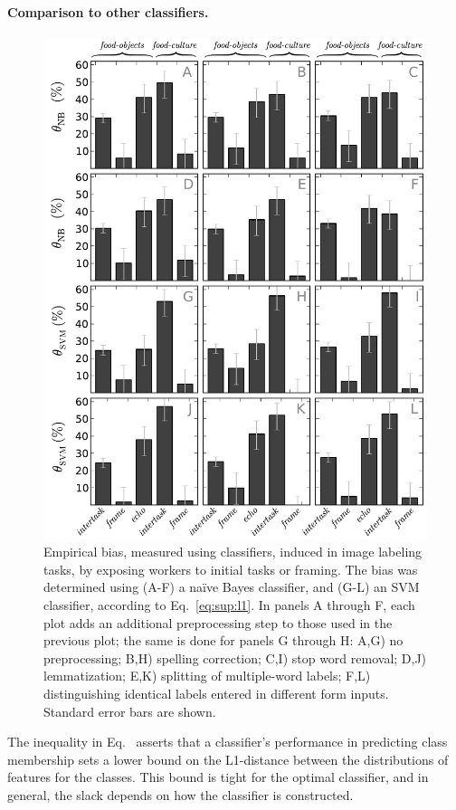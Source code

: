 \documentclass{sigchi}
\begin{document}
\paragraph{Comparison to other classifiers.} 

\begin{figure}
	\centering
	\includegraphics[scale=0.75]{figs/theta_sup.pdf}
	\caption{
		Empirical bias, measured using classifiers, induced in image 
		labeling tasks, by exposing workers to initial tasks or framing. 
		The bias was determined using (A-F) a na\"ive Bayes classifier, and 
		(G-L) an SVM classifier, according to Eq.~\ref{eq:sup:l1}.
		In panels A through F, each plot adds an additional
		preprocessing step to those used in the previous plot; the same is 
		done for panels G through H: A,G) no 
		preprocessing; B,H) spelling correction; C,I) stop word removal; 
		D,J) lemmatization; E,K) splitting of multiple-word labels; 
		F,L) distinguishing identical labels entered in different form inputs.
		Standard error bars are shown.
	}
	\label{fig:theta_sup}
\end{figure}
The inequality in Eq.~
asserts that a classifier's performance in predicting class membership
sets a lower bound on the L1-distance between the distributions of features 
for the classes.
This bound is tight for the optimal classifier, and in general, the slack
depends on how the classifier is constructed.
\end{document}

